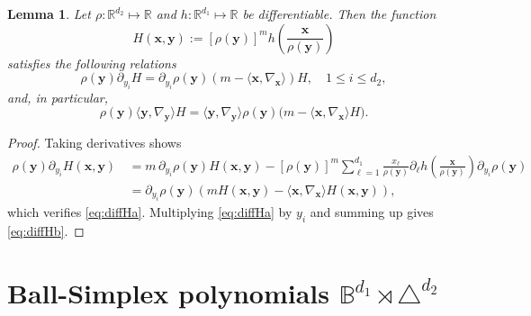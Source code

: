 \documentclass{amsart}
\newtheorem{lem}[thm]{Lemma}
\theoremstyle{remark}
\def\la{{\langle}}
\def\ra{{\rangle}}
\def\la{{\langle}}
\def\ra{{\rangle}}
\def\xb{{\bm x}}
\def\yb{{\bm y}}
\def\BB{{\mathbb B}}
\def\RR{{\mathbb R}}
\begin{document}
\begin{lem} 
Let $\rho: \RR^{d_2} \mapsto \RR$ and $h: \RR^{d_1} \mapsto \RR$ be differentiable. Then the function
$$
   H(\xb, \yb) := [\rho(\yb)]^m h\left(\frac{\xb}{\rho(\yb)} \right)
$$
satisfies the following relations
\begin{equation} \label{eq:diffHa}
  \rho(\yb)  \partial_{y_i} H = \partial_{y_i} \rho(\yb) \left( m  - \la \xb,\nabla_\xb\ra \right) H, \quad 1 \le i\le d_2,
\end{equation}
and, in particular, 
 \begin{equation} \label{eq:diffHb}
  \rho(\yb)  \la \yb, \nabla_{\yb}\ra  H = \la \yb, \nabla_{\yb}\ra \rho (\yb) \big( m  - \la \xb,\nabla_\xb\ra H \big). 
\end{equation}
\end{lem} 

\begin{proof}
Taking derivatives shows 
\begin{align*}
  \rho(\yb)  \partial_{y_i} H(\xb,\yb) \,& = m \, \partial_{y_i} \rho(\yb) H(\xb,\yb) -  [\rho(\yb)]^m 
     \sum_{\ell=1}^{d_1} \frac{x_\ell}{\rho(\yb)}  \partial_\ell h\left(\frac{\xb}{\rho(\yb)} \right)\partial_{y_i} \rho(\yb) \\
    & =  \partial_{y_i}  \rho(\yb)\left( m H(\xb,\yb)  -  \la \xb,\nabla_{\xb}\ra H(\xb, \yb) \right),
 \end{align*}
which verifies \eqref{eq:diffHa}. Multiplying \eqref{eq:diffHa} by $y_i$ and summing up gives \eqref{eq:diffHb}. 
\end{proof} 

\setcounter{equation}{0}
\section{Ball-Simplex polynomials $\BB^{d_1}\!\rtimes \triangle^{d_2}$}
\end{document}
